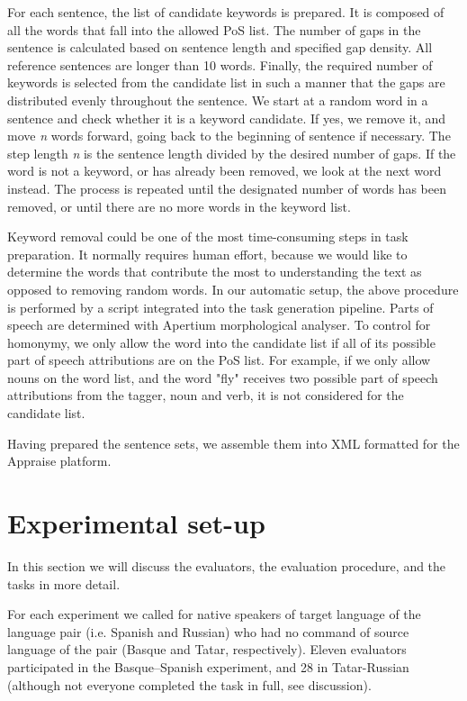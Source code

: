\documentclass[11pt]{article}
\newcommand{\comment}[1]{}
\begin{document}
For each sentence, the list of candidate keywords is prepared. It is composed of all the words that 
fall into the allowed PoS list. The number of gaps in the sentence is calculated based on 
sentence length and specified gap density. All reference sentences are longer than 10 words. Finally, the required number of keywords is selected 
from the candidate list in such a manner that the gaps are distributed evenly throughout the sentence. We start at a random word in a sentence and check whether it is a keyword candidate. If yes, we remove it, and move \emph{n} words forward, going back to the beginning of sentence if necessary. The step length \emph{n} is the sentence length divided by the desired number of gaps. If the word is not a keyword, or has already been removed, we look at the next word instead. The process is repeated until the designated number of words has been removed, or until there are no more words in the keyword list.

Keyword removal could be one of the most time-consuming steps in task preparation. It normally requires human effort, because we would like to determine the words that contribute the most to understanding the text as opposed to removing random words. In our automatic setup, the above procedure is performed by a script integrated into the task generation pipeline. Parts of speech are determined with Apertium morphological analyser. To control for homonymy, we only allow the word into the candidate list if all of its possible part of speech attributions are on the PoS list. For example, if we only allow nouns on the word list, and the word "fly" receives two possible part of speech attributions from the tagger, noun and verb, it is not considered for the candidate list.

Having prepared the sentence sets, we assemble them into XML formatted for the Appraise platform.

\section{Experimental set-up}
\label{sec:setup}

In this section we will discuss the evaluators, the evaluation procedure, and the tasks in more detail.

For each experiment we called for native speakers of target language of the language pair (i.e.
Spanish and Russian) who had no command of source language of the pair (Basque
and Tatar, respectively). Eleven evaluators participated in the Basque--Spanish experiment, and 28 in Tatar-Russian (although not everyone completed the task
in full, see discussion).
\end{document}
